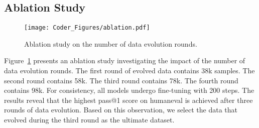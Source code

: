 \subsection{Ablation Study}

\begin{figure}
\centering
     \texttt{[image: Coder\_Figures/ablation.pdf]}
     \caption{Ablation study on the number of data evolution rounds.}
     \label{fig:ablation}
\end{figure}
Figure~\ref{fig:ablation} presents an ablation study investigating the impact of the number of data evolution rounds. The first round of evolved data contains 38k samples. The second round contains 58k. The third round contains 78k. The fourth round contains 98k. For consistency, all models undergo fine-tuning with 200 steps. The results reveal that the highest pass@1 score on humaneval is achieved after three rounds of data evolution. Based on this observation, we select the data that evolved during the third round as the ultimate dataset.

